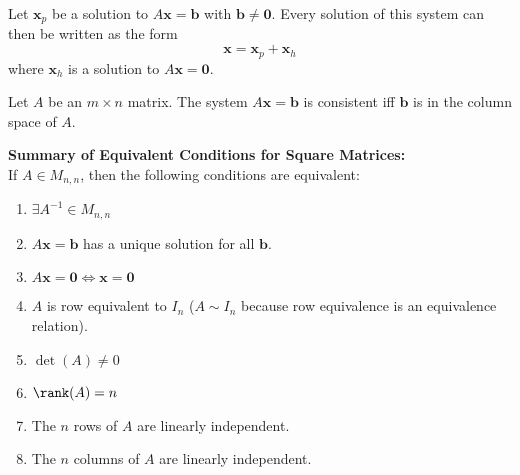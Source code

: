 \begin{theorem}
    Let \(\mathbf{x} _p\) be a solution to \(A \mathbf{x}=\mathbf{b}\) with \(\mathbf{b}\neq \mathbf{0}\). Every solution of this system can then be written as the form 
    \[
        \mathbf{x}=\mathbf{x}_p +\mathbf{x}_h
    \]
    where \(\mathbf{x}_h\) is a solution to \(A \mathbf{x}=\mathbf{0}\).
\end{theorem}
\begin{theorem}
    Let \(A\) be an \(m\times n\) matrix. The system \(A \mathbf{x}=\mathbf{b}\) is consistent iff \(\mathbf{b}\) is in the column space of \(A\).
\end{theorem}
\begin{remark}
    \textbf{Summary of Equivalent Conditions for Square Matrices:}\\
    If \(A\in M_{n,n}\), then the following conditions are equivalent:\\
    \begin{enumerate}
        \item \(\exists A^{-1} \in M_{n,n}\)
        \item \(A \mathbf{x}=\mathbf{b}\) has a unique solution for all \(\mathbf{b}\).
        \item \(A \mathbf{x}=\mathbf{0} \iff \mathbf{x}=\mathbf{0}\)
        \item \(A\) is row equivalent to \(I_n\) (\(A \sim I_n\) because row equivalence is an equivalence relation).
        \item \(\det (A)\neq 0\)
        \item \(\rank (A)=n\)
        \item The \(n\) rows of \(A\) are linearly independent.
        \item The \(n\) columns of \(A\) are linearly independent.
    \end{enumerate}
\end{remark}
